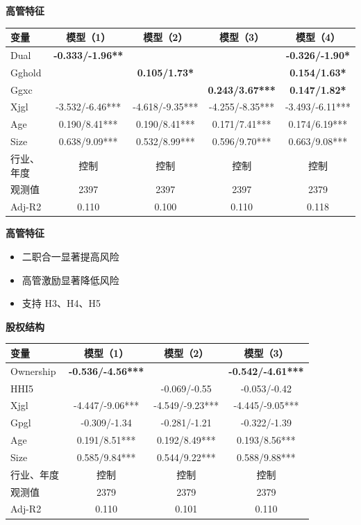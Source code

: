 \documentclass[aspectratio=169,UTF8,zihao=-4]{ctexbeamer}
\newcommand{\bigidea}[1]{
  \begin{center}
    \vspace{0.8em}
    {\LARGE \bfseries #1}
    \vspace{0.6em}
  \end{center}
}
\begin{document}
\begin{frame}
  \bigidea{高管特征}
  \centering
  \begin{tabular}{lcccc}
    \toprule
    变量 & 模型（1） & 模型（2） & 模型（3） & 模型（4） \\
    \midrule
    Dual & \textbf{-0.333/-1.96**} &  &  & \textbf{-0.326/-1.90*} \\
    Gghold &  & \textbf{0.105/1.73*} &  & \textbf{0.154/1.63*} \\
    Ggxc &  &  & \textbf{0.243/3.67***} & \textbf{0.147/1.82*} \\
    Xjgl & -3.532/-6.46*** & -4.618/-9.35*** & -4.255/-8.35*** & -3.493/-6.11*** \\
    Age & 0.190/8.41*** & 0.190/8.41*** & 0.171/7.41*** & 0.174/6.19*** \\
    Size & 0.638/9.09*** & 0.532/8.99*** & 0.596/9.70*** & 0.663/9.08*** \\
    行业、年度 & 控制 & 控制 & 控制 & 控制 \\
    观测值 & 2397 & 2397 & 2397 & 2379 \\
    Adj-R2 & 0.110 & 0.100 & 0.110 & 0.118 \\
    \bottomrule
  \end{tabular}
\end{frame}

\begin{frame}
  \bigidea{高管特征}
  \begin{itemize}
    \item \Large 二职合一显著提高风险
    \item \Large 高管激励显著降低风险
    \item \Large 支持 H3、H4、H5
  \end{itemize}
\end{frame}

\begin{frame}
  \bigidea{股权结构}
  \large
  \centering
  \begin{tabular}{lccc}
    \toprule
    变量 & 模型（1） & 模型（2） & 模型（3） \\
    \midrule
    Ownership & \textbf{-0.536/-4.56***} &  & \textbf{-0.542/-4.61***} \\
    HHI5 &  & -0.069/-0.55 & -0.053/-0.42 \\
    Xjgl & -4.447/-9.06*** & -4.549/-9.23*** & -4.445/-9.05*** \\
    Gpgl & -0.309/-1.34 & -0.281/-1.21 & -0.322/-1.39 \\
    Age & 0.191/8.51*** & 0.192/8.49*** & 0.193/8.56*** \\
    Size & 0.585/9.84*** & 0.544/9.22*** & 0.588/9.88*** \\
    行业、年度 & 控制 & 控制 & 控制 \\
    观测值 & 2379 & 2379 & 2379 \\
    Adj-R2 & 0.110 & 0.101 & 0.110 \\
    \bottomrule
  \end{tabular}
\end{frame}
\end{document}
